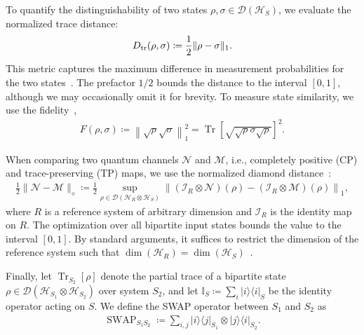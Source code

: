 \documentclass[superscriptaddress,amsmath,amssymb,aps,pra,letterpaper,tightenlines,notitlepages,12pt]{revtex4-2}
\begin{document}
To quantify the distinguishability of two states $\rho, \sigma \in \mathcal{D}(\mathcal{H}_{S})$, we evaluate the normalized trace distance:
\begin{align}
    D_{\rm tr} (\rho, \sigma) \coloneqq \frac{1}{2}\| \rho - \sigma \|_{1}.
\end{align}
This metric captures the maximum difference in measurement probabilities for the two states~\cite[Eq.~(9.22)]{wilde2017QuantumInformationTheory}. The prefactor $1/2$ bounds the distance to the interval $[0,1]$, although we may occasionally omit it for brevity. To measure state similarity, we use the fidelity~\cite{uhlmann1976TransitionProbabilityState},
\begin{align}\label{eq: fidelity definition}
    F(\rho, \sigma) \coloneqq \left\| \sqrt{\rho} \sqrt{\sigma} \right\|_1^2 = \operatorname{Tr}\!\left[\sqrt{\sqrt{\rho}\sigma\sqrt{\rho}}\right]^2.
\end{align}

When comparing two quantum channels $\mathcal{N}$ and $\mathcal{M}$, i.e., completely positive (CP) and trace-preserving (TP) maps, we use the normalized diamond distance~\cite{kitaev1997QuantumComputationsAlgorithms}:
\begin{align}
    \frac{1}{2}\| \mathcal{N} - \mathcal{M} \|_{\diamond} \coloneqq \frac{1}{2}\sup_{\rho \in \mathcal{D}(\mathcal{H}_{R}\otimes \mathcal{H}_{S})}\left\|(\mathcal{I}_{R}\otimes\mathcal{N})(\rho) - (\mathcal{I}_{R}\otimes\mathcal{M})(\rho) \right\|_{1},
\end{align}
where $R$ is a reference system of arbitrary dimension and $\mathcal{I}_{R}$ is the identity map on $R$. The optimization over all bipartite input states bounds the value to the interval $[0,1]$. By standard arguments, it suffices to restrict the dimension of the reference system such that $\dim(\mathcal{H}_{R}) = \dim(\mathcal{H}_{S})$~\cite[Theorem~9.1.1]{wilde2017QuantumInformationTheory}.

Finally, let $\operatorname{Tr}_{S_2}[\rho]$ denote the partial trace of a bipartite state $\rho \in \mathcal{D}(\mathcal{H}_{S_1} \otimes \mathcal{H}_{S_2})$ over system $S_2$, and let $\mathbb{I}_{S} \coloneqq \sum_{i}|i\rangle\!\langle i|_{S}$ be the identity operator acting on $S$. We define the SWAP operator between $S_1$ and $S_2$ as
\begin{align}\label{eq:swap-def}
    \operatorname{SWAP}_{S_1S_2} \coloneqq \sum_{i,j}|i\rangle\!\langle j|_{S_1} \otimes|j\rangle\!\langle i|_{S_2}.
\end{align}
\end{document}
